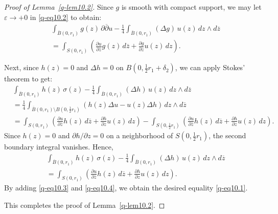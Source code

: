 \documentclass[12pt,twoside]{amsart}
\theoremstyle{definition}
\begin{document}
\begin{proof}[Proof of Lemma~\ref{q-lem10.2}]
Since \( g \) is smooth with compact support, we may 
let \( \varepsilon \to +0 \) in \eqref{q-eq10.2} to obtain:
\begin{equation}\label{q-eq10.3} 
\begin{split}
&\int_{\overline{B}(0, r_1)} g(z) \, \partial \overline{\partial} u 
- \frac{1}{4} \int_{\overline{B}(0, r_1)} (\Delta g) \, u(z) \, dz \wedge d\overline{z} \\
&= \int_{S(0, r_1)} \left( \frac{\partial u}{\partial \overline{z}} g(z) \, d\overline{z} 
+ \frac{\partial g}{\partial z} u(z) \, dz \right).
\end{split}
\end{equation}

Next, since \( h(z) = 0 \) and \( \Delta h = 0 \) 
on \( B(0, \tfrac{1}{2} r_1 + \delta_2) \), we can apply Stokes' theorem to get:
\begin{equation*}
\begin{split}
&\int_{\overline{B}(0, r_1)} h(z) \, \sigma(z) 
- \frac{1}{4} \int_{\overline{B}(0, r_1)} (\Delta h) \, u(z) \, dz \wedge d\overline{z} \\
&= \frac{1}{4} \int_{\overline{B}(0, r_1) \setminus B(0, \tfrac{1}{2} r_1)} 
\left( h(z) \Delta u - u(z) \Delta h \right) \, dz \wedge d\overline{z} \\
&= \int_{S(0, r_1)} 
\left( \frac{\partial u}{\partial \overline{z}} 
h(z) \, d\overline{z} 
+ \frac{\partial h}{\partial z} u(z) \, dz \right) 
-\int_{S(0, \tfrac{1}{2} r_1)} 
\left( \frac{\partial u}{\partial \overline{z}} h(z) \, d\overline{z} 
+ \frac{\partial h}{\partial z} u(z) \, dz \right).
\end{split}
\end{equation*}
Since \( h(z) = 0 \) and \( \partial h / \partial z = 0 \) 
on a neighborhood of \( S(0, \tfrac{1}{2} r_1) \), the second boundary integral vanishes. Hence,
\begin{equation}\label{q-eq10.4}
\begin{split}
&\int_{\overline{B}(0, r_1)} h(z) \, \sigma(z) 
- \frac{1}{4} \int_{\overline{B}(0, r_1)} (\Delta h) \, u(z) \, dz 
\wedge d\overline{z} \\
&= \int_{S(0, r_1)} \left( \frac{\partial u}{\partial \overline{z}} h(z) \, d\overline{z} 
+ \frac{\partial h}{\partial z} u(z) \, dz \right).
\end{split}
\end{equation}
By adding \eqref{q-eq10.3} and \eqref{q-eq10.4}, we obtain the desired equality \eqref{q-eq10.1}.

This completes the proof of Lemma~\ref{q-lem10.2}.
\end{proof}
\end{document}
